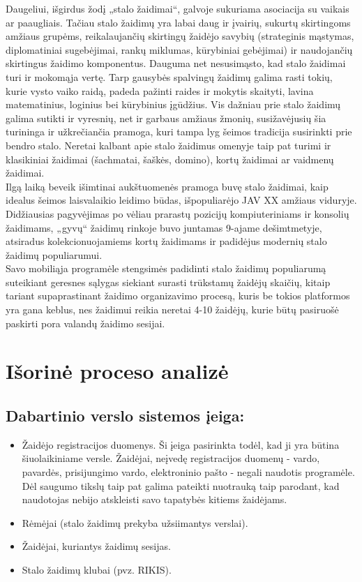 \documentclass{VUMIFPSkursinis}
\begin{document}
Daugeliui, išgirdus žodį „stalo žaidimai“, galvoje sukuriama asociacija 
su vaikais ar paaugliais. Tačiau stalo žaidimų yra labai daug ir įvairių, 
sukurtų skirtingoms amžiaus grupėms, reikalaujančių skirtingų žaidėjo savybių 
(strateginis mąstymas, diplomatiniai sugebėjimai, rankų miklumas, kūrybiniai 
gebėjimai) ir naudojančių skirtingus žaidimo komponentus. Dauguma net nesusimąsto, 
kad stalo žaidimai turi ir mokomąja vertę. Tarp gausybės spalvingų žaidimų galima 
rasti tokių, kurie vysto vaiko raidą, padeda pažinti raides ir mokytis skaityti, 
lavina matematinius, loginius bei kūrybinius įgūdžius. Vis dažniau prie stalo 
žaidimų galima sutikti ir vyresnių, net ir garbaus amžiaus žmonių, susižavėjusių 
šia turininga ir užkrečiančia pramoga, kuri tampa lyg šeimos tradicija susirinkti 
prie bendro stalo. Neretai kalbant apie stalo žaidimus omenyje taip pat turimi ir 
klasikiniai žaidimai (šachmatai, šaškės, domino), kortų žaidimai ar vaidmenų žaidimai.\\
Ilgą laiką beveik išimtinai aukštuomenės pramoga buvę stalo žaidimai, kaip idealus 
šeimos laisvalaikio leidimo būdas, išpopuliarėjo JAV XX amžiaus viduryje. 
Didžiausias pagyvėjimas po vėliau prarastų pozicijų kompiuteriniams ir konsolių 
žaidimams, „gyvų“ žaidimų rinkoje buvo juntamas 9-ajame dešimtmetyje, atsiradus 
kolekcionuojamiems kortų žaidimams ir padidėjus modernių stalo žaidimų populiarumui.\\
Savo mobiliąja programėle stengsimės padidinti stalo žaidimų populiarumą suteikiant 
geresnes sąlygas siekiant surasti trūkstamų žaidėjų skaičių, kitaip tariant 
supaprastinant žaidimo organizavimo procesą, kuris be tokios platformos yra gana 
keblus, nes žaidimui reikia neretai 4-10 žaidėjų, kurie būtų pasiruošė paskirti 
pora valandų žaidimo sesijai.

\section{Išorinė proceso analizė}
	\subsection{Dabartinio verslo sistemos įeiga:}
		\renewcommand{\labelitemi}{$\bullet$}
			\begin{itemize}
				\item Žaidėjo registracijos duomenys. Ši įeiga pasirinkta todėl, 
				kad ji yra būtina šiuolaikiniame versle. Žaidėjai, neįvedę 
				registracijos duomenų - vardo, pavardės, prisijungimo vardo, 
				elektroninio pašto - negali naudotis programėle. Dėl saugumo tikslų 
				taip pat galima pateikti nuotrauką taip parodant, kad naudotojas 
				nebijo atskleisti savo tapatybės kitiems žaidėjams.
				\item Rėmėjai (stalo žaidimų prekyba užsiimantys verslai).
				\item Žaidėjai, kuriantys žaidimų sesijas.
				\item Stalo žaidimų klubai (pvz. RIKIS).
			\end{itemize}
\end{document}

